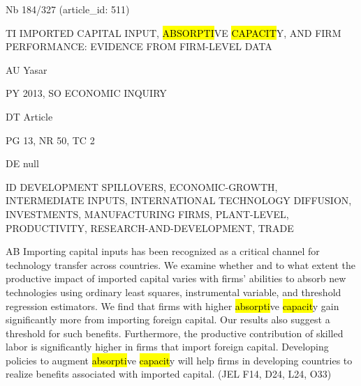 \documentclass[a4paper]{article}
\begin{document}
\vspace*{-2cm}
Nb \tabto{0cm}184/327 (article\_id: 511)\par
TI \tabto{0cm}IMPORTED CAPITAL INPUT, \hl{ABSORPTI}VE \hl{CAPACIT}Y, AND FIRM PERFORMANCE: EVIDENCE FROM FIRM-LEVEL DATA\par
AU \tabto{0cm}Yasar\par
PY \tabto{0cm}2013, SO ECONOMIC INQUIRY\par
DT \tabto{0cm}Article\par
PG \tabto{0cm}13, NR 50, TC 2\par
DE \tabto{0cm}null\par
ID \tabto{0cm}DEVELOPMENT SPILLOVERS, ECONOMIC-GROWTH, INTERMEDIATE INPUTS, INTERNATIONAL TECHNOLOGY DIFFUSION, INVESTMENTS, MANUFACTURING FIRMS, PLANT-LEVEL, PRODUCTIVITY, RESEARCH-AND-DEVELOPMENT, TRADE\par
AB \tabto{0cm}Importing capital inputs has been recognized as a critical channel for technology transfer across countries. We examine whether and to what extent the productive impact of imported capital varies with firms' abilities to absorb new technologies using ordinary least squares, instrumental variable, and threshold regression estimators. We find that firms with higher \hl{absorpti}ve \hl{capacit}y gain significantly more from importing foreign capital. Our results also suggest a threshold for such benefits. Furthermore, the productive contribution of skilled labor is significantly higher in firms that import foreign capital. Developing policies to augment \hl{absorpti}ve \hl{capacit}y will help firms in developing countries to realize benefits associated with imported capital. (JEL F14, D24, L24, O33)\par
\clearpage
\end{document}
